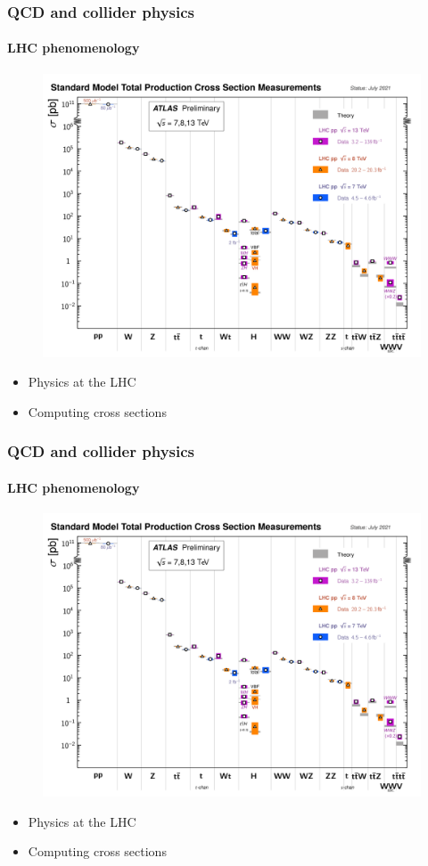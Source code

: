 \documentclass[aspectratio=43]{beamer}
\begin{document}
\begin{frame}
	
	\frametitle{QCD and collider physics}
	\framesubtitle{LHC phenomenology}
	
	\begin{figure}
		\includegraphics[width = 8.5 cm]{plots/part1/chapter3/lhc_measurements.png}
	\end{figure}
	
	\begin{itemize}
		\item \footnotesize Physics at the LHC
		\item \footnotesize Computing cross sections
	\end{itemize}

\end{frame}

\begin{frame}
	
	\frametitle{QCD and collider physics}
	\framesubtitle{LHC phenomenology}
	
	\begin{figure}
		\includegraphics[width = 8.5 cm]{plots/part1/chapter3/lhc_measurements.png}
	\end{figure}
	
	\begin{itemize}
		\item \footnotesize Physics at the LHC
		\item \footnotesize Computing cross sections
	\end{itemize}

\end{frame}
\end{document}
